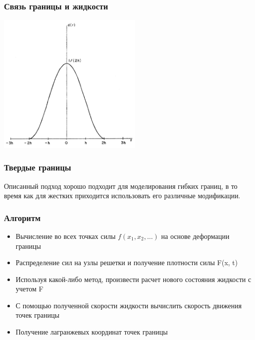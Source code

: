 \documentclass[14pt, notes]{beamer}
\begin{document}
\begin{frame}
\frametitle{Связь границы и жидкости}
    \begin{center}
        \includegraphics[width=7cm]{immersed_boundary/delta_function.png}
    \end{center}
\end{frame}

\begin{frame}
\frametitle{Твердые границы}
Описанный подход хорошо подходит для моделирования гибких границ, в то время как для жестких приходится использовать его различные модификации.
\end{frame}

\begin{frame}
\frametitle{Алгоритм}
    \begin{itemize}
        \item \alert<+>{Вычисление во всех точках силы $f(x_1, x_2, \ldots)$ на основе деформации границы}
        \item \alert<+>{Распределение сил на узлы решетки и получение плотности силы F(x, t)}
        \item \alert<+>{Используя какой-либо метод, произвести расчет нового состояния жидкости с учетом F}
        \item \alert<+>{С помощью полученной скорости жидкости вычислить скорость движения точек границы}
        \item \alert<+>{Получение лагранжевых координат точек границы}
    \end{itemize}
\end{frame}
\end{document}
